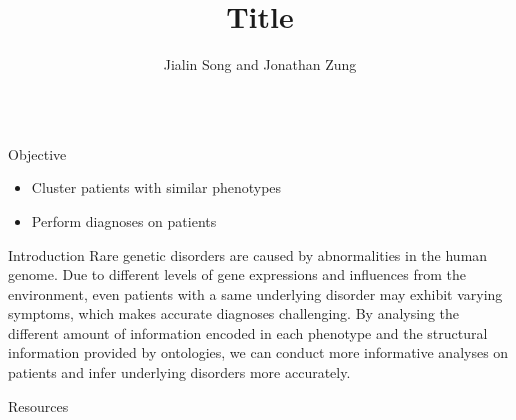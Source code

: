 \documentclass[final]{beamer} %
\title[]{{\fontsize{240}{240}\selectfont Title}}
\author[]{Jialin Song and Jonathan Zung}
\institute[University of Toronto]{Computational Biology Lab, University of Toronto}
\begin{document}
  \begin{frame}{}
  \maketitle
    \begin{columns}[T]
      \begin{column}{0.3\linewidth}

     \begin{block}{\Huge Objective}
     \begin{itemize}
    \Large
     \item
     Cluster patients with similar phenotypes
    \item
    Perform diagnoses on patients
     \end{itemize}
      \end{block}

    \begin{block}{\Huge Introduction}
    \Large
    Rare genetic disorders are caused by abnormalities in the human genome. Due to different levels of gene expressions and influences from the environment, even patients with a same underlying disorder may exhibit varying symptoms, which makes accurate diagnoses challenging. By analysing the different amount of information encoded in each phenotype and the structural information provided by ontologies, we can conduct more informative analyses on patients and infer underlying disorders more accurately. 
   \vspace{1cm} 

    \end{block}
    
    \begin{block}{\Huge Resources}
 

\end{block}
\end{column}
\end{columns}
\end{frame}
\end{document}
